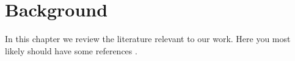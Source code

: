 \chapter{Background}

In this chapter we review the \gls{literature} relevant to our work. 
Here you most likely should have some references \cite{Tol-JoBN-1957}. 

